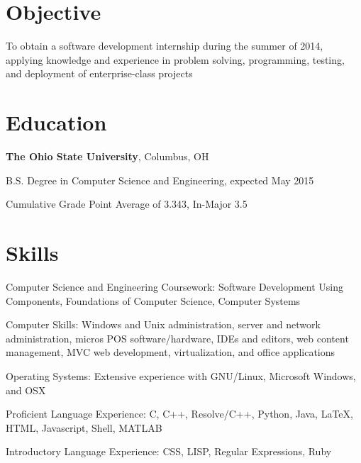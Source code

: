 \documentclass[letterpaper]{resume}
\begin{document}
\author{Christopher John Wallace}
\maketitle

\section{Objective}
\begin{compactitem}
\item
	To obtain a software development internship during the summer of 2014, applying
	knowledge and experience in problem solving, programming, testing, and
	deployment of enterprise-class projects
\end{compactitem}

\section{Education}
\textbf{The Ohio State University}, Columbus, OH

\begin{compactitem}
\item B.S. Degree in Computer Science and Engineering, expected May 2015
\item Cumulative Grade Point Average of 3.343, In-Major 3.5
\end{compactitem}

\section{Skills}

\begin{compactitem}
\item Computer Science and Engineering Coursework:
	Software Development Using Components, Foundations of Computer Science,
	Computer Systems

\item Computer Skills: Windows and Unix administration,
	server and network administration,
	micros POS software/hardware, IDEs and editors, web content management,
	MVC web development, virtualization, and office applications

\item Operating Systems: Extensive experience with GNU/Linux,
	Microsoft Windows, and OSX

\item Proficient Language Experience: C, C++, Resolve/C++, Python, Java,
	\LaTeX, HTML, Javascript, Shell, MATLAB
\item Introductory Language Experience: CSS, LISP, Regular Expressions, Ruby

\end{compactitem}
\end{document}
